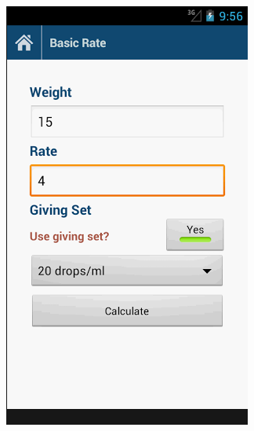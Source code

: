 \documentclass{l3proj}
\begin{document}
\begin{figure}[!htb]
  \includegraphics[width=\linewidth]{images/VetCalcApp/VetCalcApp3.png}
\endminipage\hfill
{}%

\end{figure}
\end{document}
